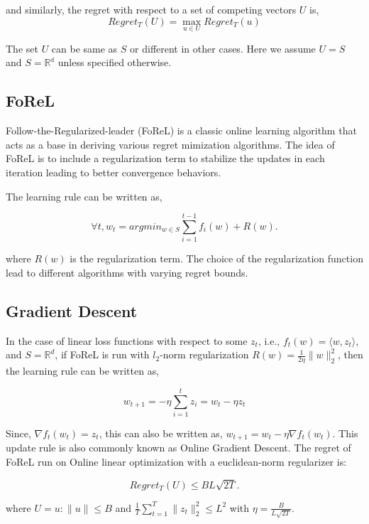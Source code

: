 and
similarly, the regret with respect to a set of competing vectors $U$ is, \begin{equation}
	Regret_T(U) = \max_{u \in U} Regret_T(u)
\end{equation}

The set $U$ can be same
as $S$ or different in other cases.
Here we assume $U=S$ and $S=\mathbb{R^d}$ unless specified otherwise.

\subsection{FoReL}\label{sec:forel}

Follow-the-Regularized-leader (FoReL) is a classic online learning algorithm that acts as a base in
deriving various regret mimization algorithms.
The idea of FoReL is to include a regularization term to stabilize the updates in each iteration
leading to better convergence behaviors.

The learning rule can be written as,

$$\forall t, w_t = argmin_{w \in S}
	\sum_{i=1}^{t-1} f_i(w) + R(w).
$$

where $R(w)$ is the regularization term.
The choice of the regularization function lead to different algorithms with varying regret bounds.

\subsection{Gradient Descent}

In the case of linear loss functions with respect to some $z_t$, i.e., $f_t(w) = \langle w, z_t
	\rangle$, and $S=\mathbb{R}^d$, if FoReL is run with $l_2$-norm regularization $R(w) = \frac{1}{2
		\eta} \|w\|_2^2$, then the learning rule can be written as,

\begin{equation}
	w_{t+1} = -\eta \sum_{i=1}^t z_i = w_t - \eta z_t
\end{equation}

Since, $\nabla
	f_t(w_t) = z_t$, this can also be written as, $w_{t+1} = w_t - \eta \nabla f_t(w_t)$.
This update rule is also commonly known as Online Gradient Descent.
The regret of FoReL run on Online linear optimization with a euclidean-norm regularizer is:

$$Regret_T(U) \leq BL \sqrt {2T}.
$$

where $U = {u : \|u\| \leq B}$ and $\frac{1}{T} \sum_{t=1}^T \|z_t\|_2^2 \leq L^2$ with $\eta = \frac{B}{L\sqrt{2T}}$.

